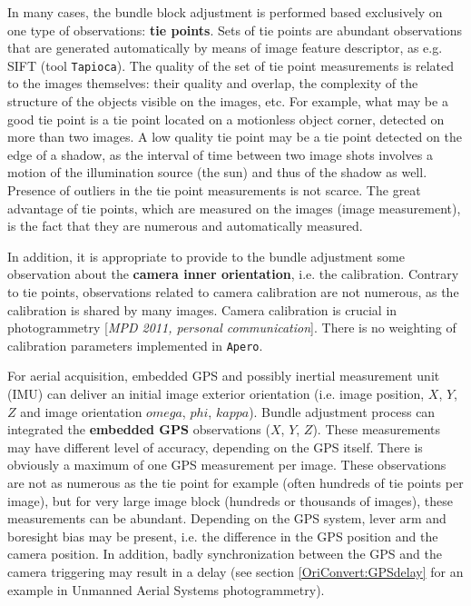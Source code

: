 In many cases, the bundle block adjustment is performed based exclusively on one type of observations: {\bf tie points}. 
Sets of tie points are abundant observations that are generated automatically by means of image feature descriptor, as e.g. SIFT (tool {\tt Tapioca}). 
The quality of the set of tie point measurements is related to the images themselves: their quality and overlap, the complexity of the structure of the objects visible on the images, etc. For example, what may be a good tie point is a tie point located on a motionless object corner, detected on more than two images. A low quality tie point may be a tie point detected on the edge of a shadow, as the interval of time between two image shots involves a motion of the illumination source (the sun) and thus of the shadow as well. Presence of outliers in the tie point measurements is not scarce. 
The great advantage of tie points, which are measured on the images (image measurement), is the fact that they are numerous and automatically measured.

In addition, it is appropriate to provide to the bundle adjustment some observation about the {\bf camera inner orientation}, i.e. the calibration. 
Contrary to tie points, observations related to camera calibration are not numerous, as the calibration is shared by many images. 
Camera calibration is crucial in photogrammetry [{\it MPD 2011, personal communication}]. 
There is no weighting of calibration parameters implemented in {\tt Apero}.

For aerial acquisition, embedded GPS and possibly inertial measurement unit (IMU) can deliver an initial image exterior orientation (i.e. image position, $X$, $Y$, $Z$ and image orientation $omega$, $phi$, $kappa$). 
Bundle adjustment process can integrated the {\bf embedded GPS} observations ($X$, $Y$, $Z$). 
These measurements may have different level of accuracy, depending on the GPS itself. 
There is obviously a maximum of one GPS measurement per image. 
These observations are not as numerous as the tie point for example (often hundreds of tie points per image), but for very large image block (hundreds or thousands of images), these measurements can be abundant. 
Depending on the GPS system, lever arm and boresight bias may be present, i.e. the difference in the GPS position and the camera position. 
In addition, badly synchronization between the GPS and the camera triggering may result in a delay (see section \ref{OriConvert:GPSdelay} for an example in Unmanned Aerial Systems photogrammetry).

